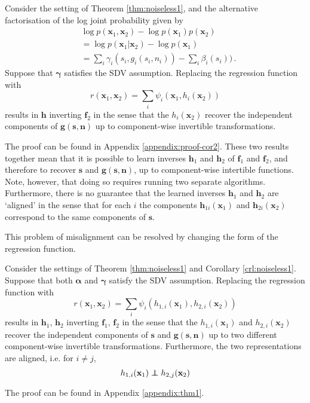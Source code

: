 \medskip

\begin{corollary}
	\label{crl:noiseless1}
	Consider the setting of Theorem \ref{thm:noiseless1}, and the alternative factorisation of the log joint probability given by
	\begin{align}
	&\log p(\bm{x}_1, \bm{x}_2) - \log p(\bm{x}_1) p(\bm{x}_2) \nonumber \\
	&= \log p(\bm{x}_1 | \bm{x}_2) - \log p(\bm{x}_1)\nonumber \\
	&= \sum_i \gamma_i(s_{i}, g_i(s_i, n_i)) - \sum_i \beta_i(s_i)) \label{eq:logdens_noiesless_2}\,.
	\end{align}
	Suppose that $\bm{\gamma}$ satisfies the SDV assumption.
	Replacing the regression function with
	\begin{equation*}
	r(\bm{x}_{1},\bm{x}_{2})=\sum_{i}\psi_{i}(\bm{x}_{1}, h_{i}(\bm{x}_{2}))
	\end{equation*}
	results in $\bm{h}$ inverting $\bm{f}_2$ in the sense that the $h_{i}(\bm{x}_2)$ recover the independent components of $\bm{g}(\bm{s}, \bm{n})$ up  to component-wise invertible transformations.
\end{corollary}The proof can be found in Appendix \ref{appendix:proof-cor2}.
These two results together mean that it is possible to learn inverses $\bm{h}_1$ and $\bm{h}_2$ of $\bm{f}_1$ and $\bm{f}_2$, and therefore to recover $\bm{s}$ and $\bm{g}(\bm{s}, \bm{n})$, up to component-wise intertible functions.
Note, however, that doing so requires running two separate algorithms.
Furthermore, there is no guarantee that the learned inverses $\bm{h}_1$ and $\bm{h}_2$ are `aligned' in the sense that for each $i$ the components $\bm{h}_{1i}(\bm{x}_1)$ and $\bm{h}_{2i}(\bm{x}_2)$ correspond to the same components of $\bm{s}$.

This problem of misalignment can be resolved by changing the form of the regression function.

\medskip

\begin{theorem}\label{thm:demixing}
	Consider the settings of Theorem \ref{thm:noiseless1} and Corollary \ref{crl:noiseless1}.
	Suppose that both $\bm{\alpha}$ and $\bm{\gamma}$ satisfy the SDV assumption.
	Replacing the regression function with
	\begin{equation}\label{eqn:double-regression-fn}
	r(\bm{x}_{1},\bm{x}_{2})=\sum_{i}\psi_{i}(h_{1,i}(\bm{x}_{1}),h_{2,i}(\bm{x}_{2}))
	\end{equation}
	results in $\bm{h}_1$, $\bm{h}_2$ inverting $\bm{f}_1$, $\bm{f}_2$ in the sense that the $h_{1,i}(\bm{x}_1)$ and $h_{2,i}(\bm{x}_2)$ recover the independent components of $\bm{s}$ and $\bm{g}(\bm{s}, \bm{n})$ up to two different component-wise invertible transformations. Furthermore, the two representations are aligned, i.e. for $i\not=j$,
	\begin{equation*}
	h_{1,i}(\mathbf{x}_{1})\independent h_{2,j}(\mathbf{x}_{2})
	\end{equation*}
\end{theorem}
The proof can be found in Appendix \ref{appendix:thm1}.

